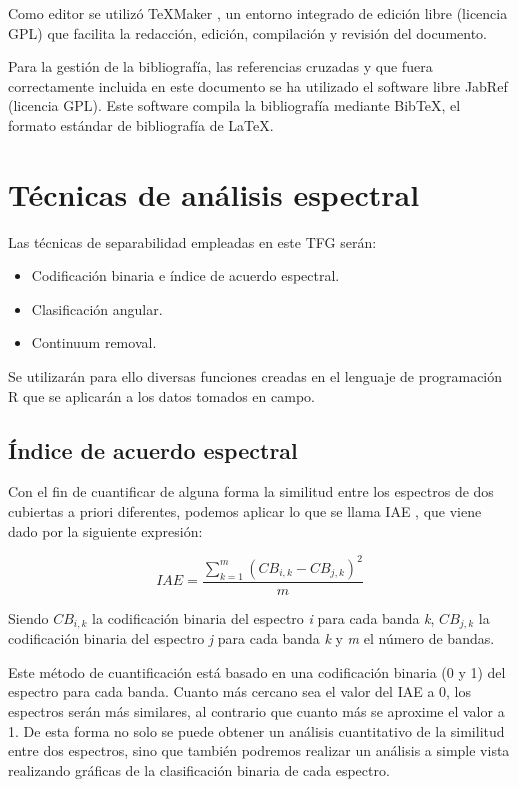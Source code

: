 Como editor se utilizó TeXMaker \citep{Brachet2003}, un entorno integrado de edición libre (licencia GPL) que facilita la redacción, edición, compilación y revisión del documento.\Sep

Para la gestión de la bibliografía, las referencias cruzadas y que fuera correctamente incluida en este documento se ha utilizado el software libre JabRef (licencia GPL). Este software compila la bibliografía mediante BibTeX, el formato estándar de bibliografía de \LaTeX.

\section{Técnicas de análisis espectral}
\label{sec:tecnicas}

Las técnicas de separabilidad empleadas en este \ac{TFG} serán:
\begin{itemize}
	\item Codificación binaria e índice de acuerdo espectral.
	\item Clasificación angular.
	\item Continuum removal.
\end{itemize}

Se utilizarán para ello diversas funciones creadas en el lenguaje de programación R que se aplicarán a los datos tomados en campo.

\subsection{Índice de acuerdo espectral}
Con el fin de cuantificar de alguna forma la similitud entre los espectros de dos cubiertas a priori diferentes, podemos aplicar lo que se llama \ac{IAE} \citep{chuvieco2002teledeteccion}, que viene dado por la siguiente expresión:

\begin{equation} \label{eq:IAE}
	IAE = \frac{\displaystyle\sum_{k=1}^m(CB_{i,k} - CB_{j,k})^{2}}{m}
\end{equation}\Sep

Siendo $CB_{i,k}$ la codificación binaria del espectro \textit{i} para cada banda \textit{k}, $CB_{j,k}$ la codificación binaria del espectro \textit{j} para cada banda \textit{k} y \textit{m} el número de bandas.\Sep

Este método de cuantificación está basado en una codificación binaria (0 y 1) del espectro para cada banda. Cuanto más cercano sea el valor del \ac{IAE} a 0, los espectros serán más similares, al contrario que cuanto más se aproxime el valor a 1. De esta forma no solo se puede obtener un análisis cuantitativo de la similitud entre dos espectros, sino que también podremos realizar un análisis a simple vista realizando gráficas de la clasificación binaria de cada espectro.\Sep


